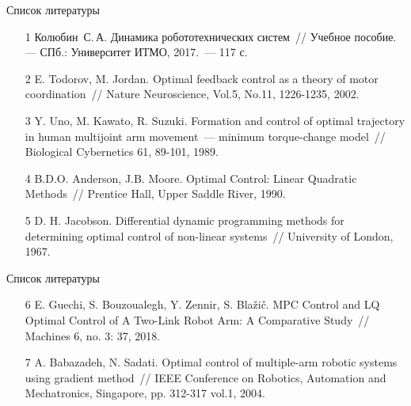     \begin{frame}{Список литературы}
        \begin{enumerate}
            \item[1] Колюбин~С.\,А. Динамика робототехнических систем~// Учебное пособие. --- СПб.: Университет ИТМО, 2017.~--- 117 с.
            \item[2] E. Todorov, M. Jordan. Optimal feedback control as a theory of motor coordination~// Nature Neuroscience, Vol.5, No.11, 1226-1235, 2002.
            \item[3] Y. Uno, M. Kawato, R. Suzuki. Formation and control of optimal trajectory in human multijoint arm movement~--- minimum torque-change model~// Biological Cybernetics 61, 89-101, 1989.
            \item[4] B.D.O. Anderson, J.B. Moore. Optimal Control: Linear Quadratic Methods~// Prentice Hall, Upper Saddle River, 1990.
            \item[5] D. H. Jacobson. Differential dynamic programming methods for determining optimal control of non-linear systems~// University of London, 1967.
        \end{enumerate}
    \end{frame}

    \begin{frame}{Список литературы}
        \begin{enumerate}
            \item[6] E. Guechi, S. Bouzoualegh, Y. Zennir, S. Blažič. MPC Control and LQ Optimal Control of A Two-Link Robot Arm: A Comparative Study~// Machines 6, no. 3: 37, 2018.
            \item[7] A. Babazadeh, N. Sadati. Optimal control of multiple-arm robotic systems using gradient method~// IEEE Conference on Robotics, Automation and Mechatronics, Singapore, pp. 312-317 vol.1, 2004.
        \end{enumerate}
    \end{frame}

